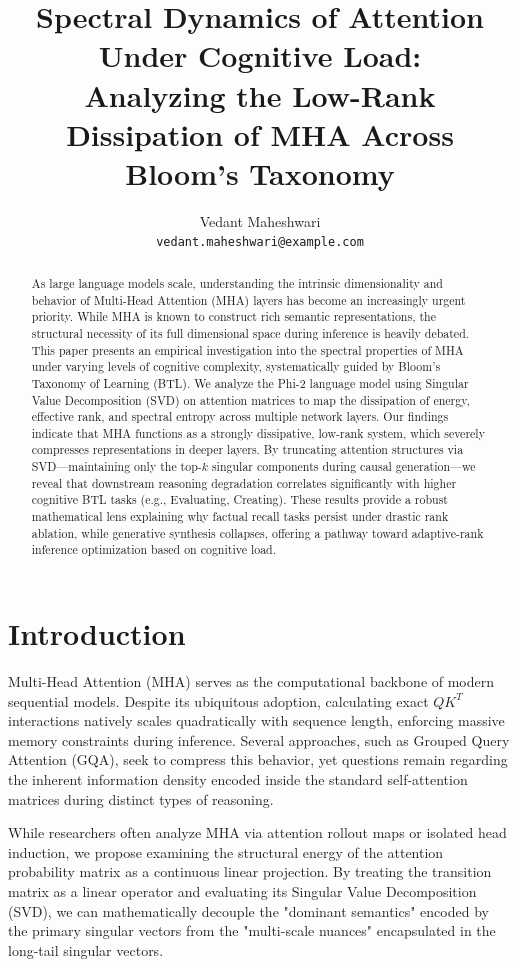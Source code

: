\documentclass{article}
\title{Spectral Dynamics of Attention Under Cognitive Load: \\ Analyzing the Low-Rank Dissipation of MHA Across Bloom's Taxonomy}
\author{
  Vedant Maheshwari \\
  \texttt{vedant.maheshwari@example.com} \\
}
\date{}
\begin{document}
\maketitle

\begin{abstract}
As large language models scale, understanding the intrinsic dimensionality and behavior of Multi-Head Attention (MHA) layers has become an increasingly urgent priority. While MHA is known to construct rich semantic representations, the structural necessity of its full dimensional space during inference is heavily debated. This paper presents an empirical investigation into the spectral properties of MHA under varying levels of cognitive complexity, systematically guided by Bloom’s Taxonomy of Learning (BTL). We analyze the Phi-2 language model using Singular Value Decomposition (SVD) on attention matrices to map the dissipation of energy, effective rank, and spectral entropy across multiple network layers. Our findings indicate that MHA functions as a strongly dissipative, low-rank system, which severely compresses representations in deeper layers. By truncating attention structures via SVD—maintaining only the top-$k$ singular components during causal generation—we reveal that downstream reasoning degradation correlates significantly with higher cognitive BTL tasks (e.g., Evaluating, Creating). These results provide a robust mathematical lens explaining why factual recall tasks persist under drastic rank ablation, while generative synthesis collapses, offering a pathway toward adaptive-rank inference optimization based on cognitive load.
\end{abstract}

\section{Introduction}

Multi-Head Attention (MHA) serves as the computational backbone of modern sequential models. Despite its ubiquitous adoption, calculating exact $Q K^T$ interactions natively scales quadratically with sequence length, enforcing massive memory constraints during inference. Several approaches, such as Grouped Query Attention (GQA), seek to compress this behavior, yet questions remain regarding the inherent information density encoded inside the standard self-attention matrices during distinct types of reasoning.

While researchers often analyze MHA via attention rollout maps or isolated head induction, we propose examining the structural energy of the attention probability matrix as a continuous linear projection. By treating the transition matrix as a linear operator and evaluating its Singular Value Decomposition (SVD), we can mathematically decouple the "dominant semantics" encoded by the primary singular vectors from the "multi-scale nuances" encapsulated in the long-tail singular vectors.
\end{document}
